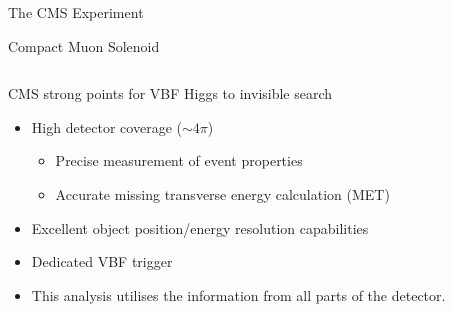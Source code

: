 \documentclass[8pt]{beamer}
\begin{document}
\begin{frame}{The CMS Experiment}
\begin{block}{Compact Muon Solenoid}
\begin{columns}
    \end{columns}

\end{block}
\begin{block}{CMS strong points for VBF Higgs to invisible search}  

\begin{itemize}
  \item High detector coverage ($\sim4 \pi$)
  \begin{itemize}
    \item Precise measurement of event properties
    \item Accurate missing transverse energy calculation (MET)  
  \end{itemize}
  \item Excellent object position/energy resolution capabilities
  \item Dedicated VBF trigger
  \item This analysis utilises the information from all parts of the detector.
\end{itemize}

\end{block}

\end{frame}
\end{document}
